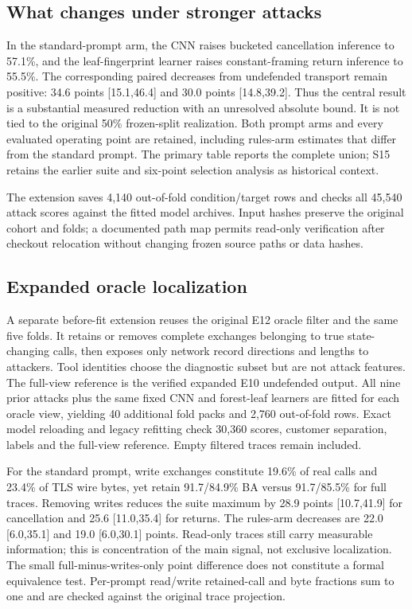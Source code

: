 

\subsection{What changes under stronger attacks}
In the standard-prompt arm, the CNN raises bucketed cancellation inference to 57.1\%, and the leaf-fingerprint learner raises constant-framing return inference to 55.5\%. The corresponding paired decreases from undefended transport remain positive: 34.6 points [15.1,46.4] and 30.0 points [14.8,39.2]. Thus the central result is a substantial measured reduction with an unresolved absolute bound. It is not tied to the original 50\% frozen-split realization. Both prompt arms and every evaluated operating point are retained, including rules-arm estimates that differ from the standard prompt. The primary table reports the complete union; S15 retains the earlier suite and six-point selection analysis as historical context.

The extension saves 4,140 out-of-fold condition/target rows and checks all 45,540 attack scores against the fitted model archives. Input hashes preserve the original cohort and folds; a documented path map permits read-only verification after checkout relocation without changing frozen source paths or data hashes.

\subsection{Expanded oracle localization}
A separate before-fit extension reuses the original E12 oracle filter and the same five folds. It retains or removes complete exchanges belonging to true state-changing calls, then exposes only network record directions and lengths to attackers. Tool identities choose the diagnostic subset but are not attack features. The full-view reference is the verified expanded E10 undefended output. All nine prior attacks plus the same fixed CNN and forest-leaf learners are fitted for each oracle view, yielding 40 additional fold packs and 2,760 out-of-fold rows. Exact model reloading and legacy refitting check 30,360 scores, customer separation, labels and the full-view reference. Empty filtered traces remain included.



For the standard prompt, write exchanges constitute 19.6\% of real calls and 23.4\% of TLS wire bytes, yet retain 91.7/84.9\% BA versus 91.7/85.5\% for full traces. Removing writes reduces the suite maximum by 28.9 points [10.7,41.9] for cancellation and 25.6 [11.0,35.4] for returns. The rules-arm decreases are 22.0 [6.0,35.1] and 19.0 [6.0,30.1] points. Read-only traces still carry measurable information; this is concentration of the main signal, not exclusive localization. The small full-minus-writes-only point difference does not constitute a formal equivalence test. Per-prompt read/write retained-call and byte fractions sum to one and are checked against the original trace projection.
